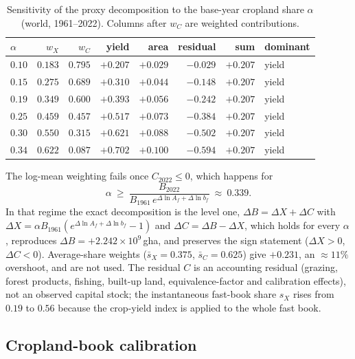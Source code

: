 \begin{table}[htbp]
\centering\small
\caption{Sensitivity of the proxy decomposition to the base-year cropland share $\alpha$ (world, 1961--2022). Columns after $w_C$ are weighted contributions.}
\label{tab:si_alpha}
\begin{tabular}{l r r r r r r l}
\toprule
$\alpha$ & $w_X$ & $w_C$ & yield & area & residual & sum & dominant \\
\midrule
$0.10$ & $0.183$ & $0.795$ & $+0.207$ & $+0.029$ & $-0.029$ & $+0.207$ & yield \\
$0.15$ & $0.275$ & $0.689$ & $+0.310$ & $+0.044$ & $-0.148$ & $+0.207$ & yield \\
$0.19$ & $0.349$ & $0.600$ & $+0.393$ & $+0.056$ & $-0.242$ & $+0.207$ & yield \\
$0.25$ & $0.459$ & $0.457$ & $+0.517$ & $+0.073$ & $-0.384$ & $+0.207$ & yield \\
$0.30$ & $0.550$ & $0.315$ & $+0.621$ & $+0.088$ & $-0.502$ & $+0.207$ & yield \\
$0.34$ & $0.622$ & $0.087$ & $+0.702$ & $+0.100$ & $-0.594$ & $+0.207$ & yield \\
\bottomrule
\end{tabular}
\end{table}

The log-mean weighting fails once $C_{2022}\le0$, which happens for
\begin{equation}
\alpha\ \ge\ \frac{B_{2022}}{B_{1961}\,e^{\Delta\ln A_f+\Delta\ln b_f}}\ \approx\ 0.339 .
\end{equation}
In that regime the exact decomposition is the level one, $\Delta B=\Delta X+\Delta C$ with $\Delta X=\alpha B_{1961}(e^{\Delta\ln A_f+\Delta\ln b_f}-1)$ and $\Delta C=\Delta B-\Delta X$, which holds for every $\alpha$, reproduces $\Delta B=+2.242\times10^{9}$\,gha, and preserves the sign statement ($\Delta X>0$, $\Delta C<0$). Average-share weights ($\bar s_X=0.375$, $\bar s_C=0.625$) give $+0.231$, an $\approx11\%$ overshoot, and are not used. The residual $C$ is an accounting residual (grazing, forest products, fishing, built-up land, equivalence-factor and calibration effects), not an observed capital stock; the instantaneous fast-book share $s_X$ rises from $0.19$ to $0.56$ because the crop-yield index is applied to the whole fast book.

\subsection{Cropland-book calibration}\label{si:cropland}

